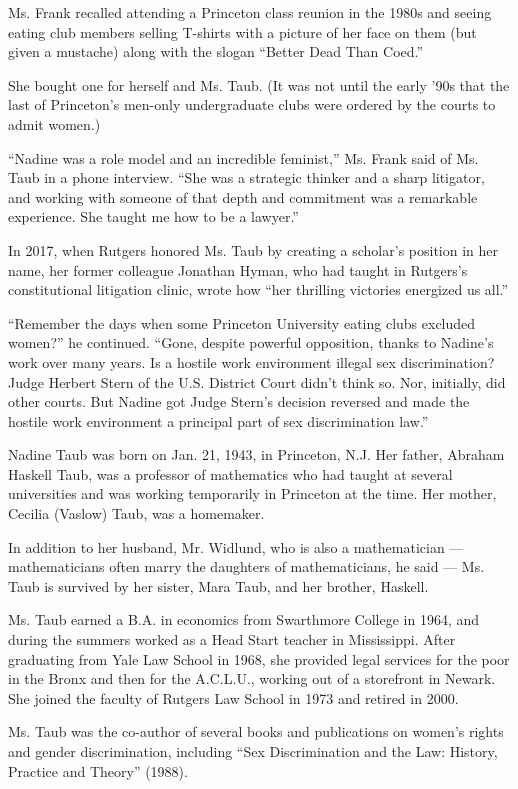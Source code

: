Ms. Frank recalled attending a Princeton class reunion in the 1980s and
seeing eating club members selling T-shirts with a picture of her face
on them (but given a mustache) along with the slogan ``Better Dead Than
Coed.''

She bought one for herself and Ms. Taub. (It was not until the early
'90s that the last of Princeton's men-only undergraduate clubs were
ordered by the courts to admit women.)

``Nadine was a role model and an incredible feminist,'' Ms. Frank said
of Ms. Taub in a phone interview. ``She was a strategic thinker and a
sharp litigator, and working with someone of that depth and commitment
was a remarkable experience. She taught me how to be a lawyer.''

In 2017, when Rutgers honored Ms. Taub by creating a scholar's position
in her name, her former colleague Jonathan Hyman, who had taught in
Rutgers's constitutional litigation clinic, wrote how ``her thrilling
victories energized us all.''

``Remember the days when some Princeton University eating clubs excluded
women?'' he continued. ``Gone, despite powerful opposition, thanks to
Nadine's work over many years. Is a hostile work environment illegal sex
discrimination? Judge Herbert Stern of the U.S. District Court didn't
think so. Nor, initially, did other courts. But Nadine got Judge Stern's
decision reversed and made the hostile work environment a principal part
of sex discrimination law.''

Nadine Taub was born on Jan. 21, 1943, in Princeton, N.J. Her father,
Abraham Haskell Taub, was a professor of mathematics who had taught at
several universities and was working temporarily in Princeton at the
time. Her mother, Cecilia (Vaslow) Taub, was a homemaker.

In addition to her husband, Mr. Widlund, who is also a mathematician ---
mathematicians often marry the daughters of mathematicians, he said ---
Ms. Taub is survived by her sister, Mara Taub, and her brother, Haskell.

Ms. Taub earned a B.A. in economics from Swarthmore College in 1964, and
during the summers worked as a Head Start teacher in Mississippi. After
graduating from Yale Law School in 1968, she provided legal services for
the poor in the Bronx and then for the A.C.L.U., working out of a
storefront in Newark. She joined the faculty of Rutgers Law School in
1973 and retired in 2000.

Ms. Taub was the co-author of several books and publications on women's
rights and gender discrimination, including ``Sex Discrimination and the
Law: History, Practice and Theory'' (1988).

